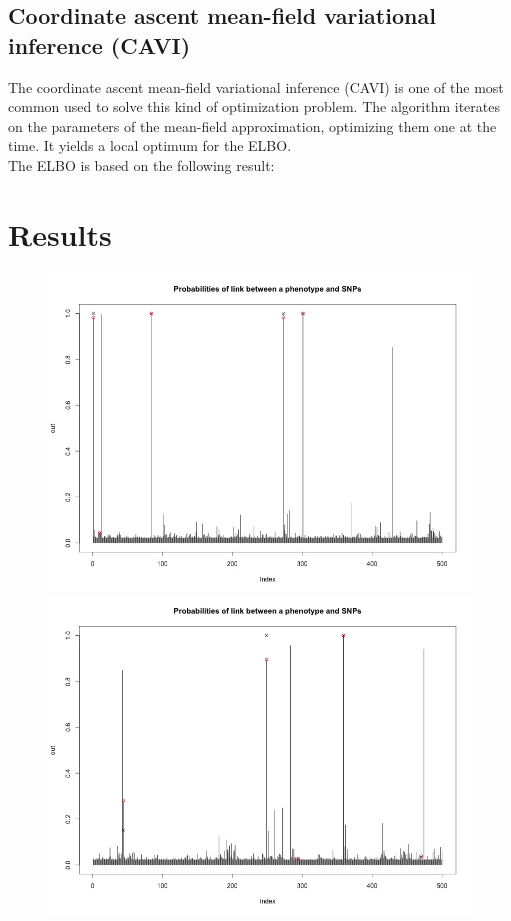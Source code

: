 \documentclass{article}
\begin{document}
\subsection{Coordinate ascent mean-field variational inference \small{(CAVI)}}
The coordinate ascent mean-field variational inference (\small{CAVI}) is one of the most common used to solve this kind of optimization problem. The algorithm iterates on the parameters of the mean-field approximation, optimizing them one at the time. It yields a local optimum for the \small{ELBO}.\\
\newline
The \small{ELBO} is based on the following result:
\newpage
\section{Results}
\begin{figure}
\includegraphics[width=5in]{images/multipleProba1.jpg}
\includegraphics[width=5in]{images/multipleProba2.jpg}
\end{figure}
\end{document}
